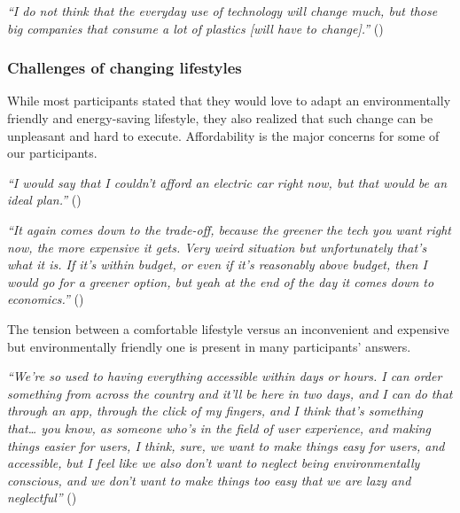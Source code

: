     \begin{quoting}
        \textit{``I do not think that the everyday use of technology will change much, but those big companies that consume a lot of plastics [will have to change].''} ()
    \end{quoting}
    
    \subsubsection{Challenges of changing lifestyles}
    
    While most participants stated that they would love to adapt an environmentally friendly and energy-saving lifestyle, they also realized that such change can be unpleasant and hard to execute. Affordability is the major concerns for some of our participants. %
    
    \begin{quoting}
        \textit{``I would say that I couldn't afford an electric car right now, but that would be an ideal plan.''} ()
    \end{quoting}
    
    \begin{quoting}
        \textit{``It again comes down to the trade-off, because the greener the tech you want right now, the more expensive it gets. Very weird situation but unfortunately that's what it is. If it's within budget, or even if it's reasonably above budget, then I would go for a greener option, but yeah at the end of the day it comes down to economics.''} ()
    \end{quoting}
    
    The tension between a comfortable lifestyle versus an inconvenient and expensive but environmentally friendly one is present in many participants' answers. %
    
    \begin{quoting}
        \textit{``We're so used to having everything accessible within days or hours. I can order something from across the country and it'll be here in two days, and I can do that through an app, through the click of my fingers, and I think that's something that… you know, as someone who's in the field of user experience, and making things easier for users, I think, sure, we want to make things easy for users, and accessible, but I feel like we also don't want to neglect being environmentally conscious, and we don't want to make things too easy that we are lazy and neglectful''} ()
    \end{quoting}

